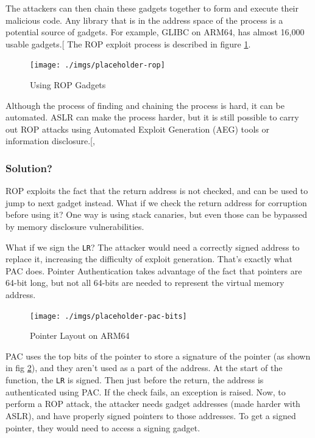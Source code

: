\documentclass[a4paper, nobind]{templates/ociamthesis}
\begin{document}
The attackers can then chain these gadgets together to form and execute their malicious code.
Any library that is in the address space of the process is a potential source of gadgets.
For example, GLIBC on ARM64, has almost 16,000 usable gadgets.{[}\citeproc{ref-riscyrop}{12}{]}
The ROP exploit process is described in figure \ref{fig:rop-diag}.

\begin{figure}

{\centering \texttt{[image: ./imgs/placeholder-rop]} 

}

\caption{Using ROP Gadgets}\label{fig:rop-diag}
\end{figure}

Although the process of finding and chaining the process is hard, it can be automated.
ASLR can make the process harder, but it is still possible to carry out ROP attacks using
Automated Exploit Generation (AEG) tools or information disclosure.{[}, \citeproc{ref-riscyrop}{12}{]}

\subsubsection{Solution?}\label{solution}

ROP exploits the fact that the return address is not checked, and can be used to
jump to next gadget instead. What if we check the return address for corruption
before using it? One way is using stack canaries, but even those can be bypassed
by memory disclosure vulnerabilities.

What if we sign the \texttt{LR}? The attacker would need a correctly signed address to replace it,
increasing the difficulty of exploit generation.
That's exactly what PAC does. Pointer Authentication
takes advantage of the fact that pointers are 64-bit long, but not all 64-bits
are needed to represent the virtual memory address.

\begin{figure}

{\centering \texttt{[image: ./imgs/placeholder-pac-bits]} 

}

\caption{Pointer Layout on ARM64}\label{fig:pac-bits}
\end{figure}

PAC uses the top bits of the pointer to store a signature of the pointer
(as shown in fig \ref{fig:pac-bits}), and they aren't
used as a part of the address. At the start of the function, the \texttt{LR} is signed.
Then just before the return, the address is authenticated using PAC. If the check fails,
an exception is raised. Now, to perform a ROP attack, the attacker needs gadget addresses
(made harder with ASLR), and have properly signed pointers to those addresses.
To get a signed pointer, they would need to access a signing gadget.
\end{document}

